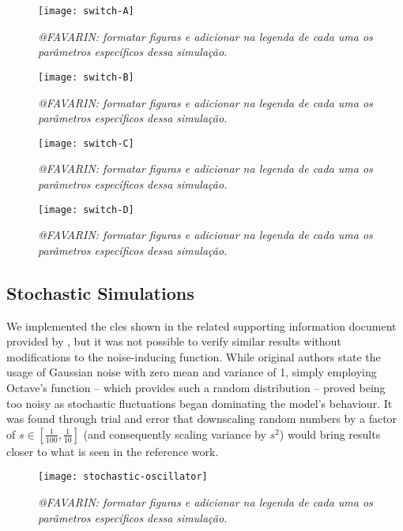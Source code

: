     \begin{figure}[!htbp]
      \centering
      \texttt{[image: switch-A]}
      \caption{\textit{@FAVARIN: formatar figuras e adicionar na legenda de cada uma os parâmetros específicos dessa simulação.}}
      \label{fig.switch-A}
    \end{figure}

    \begin{figure}[!htbp]
      \centering
      \texttt{[image: switch-B]}
      \caption{\textit{@FAVARIN: formatar figuras e adicionar na legenda de cada uma os parâmetros específicos dessa simulação.}}
      \label{fig.switch-B}
    \end{figure}

    \begin{figure}[!htbp]
      \centering
      \texttt{[image: switch-C]}
      \caption{\textit{@FAVARIN: formatar figuras e adicionar na legenda de cada uma os parâmetros específicos dessa simulação.}}
      \label{fig.switch-C}
    \end{figure}

    \begin{figure}[!htbp]
      \centering
      \texttt{[image: switch-D]}
      \caption{\textit{@FAVARIN: formatar figuras e adicionar na legenda de cada uma os parâmetros específicos dessa simulação.}}
      \label{fig.switch-D}
    \end{figure}


  \subsection{Stochastic Simulations}

    We implemented the \ac{cles} shown in the related supporting information document provided by \citet{originals}, but it was not possible to verify similar results without modifications to the noise-inducing function.
    While original authors state the usage of Gaussian noise with zero mean and variance of 1, simply employing Octave's  function -- which provides such a random distribution \cite{randn} -- proved being too noisy as stochastic fluctuations began dominating the model's behaviour.
    It was found through trial and error that downscaling random numbers by a factor of $s \in [\frac{1}{100}, \frac{1}{10}]$ (and consequently scaling variance by $s^2$) would bring results closer to what is seen in the reference work.

    \begin{figure}[!htbp]
      \centering
      \texttt{[image: stochastic-oscillator]}
      \caption{\textit{@FAVARIN: formatar figuras e adicionar na legenda de cada uma os parâmetros específicos dessa simulação.}}
      \label{fig.stochastic-oscillator}
    \end{figure}

